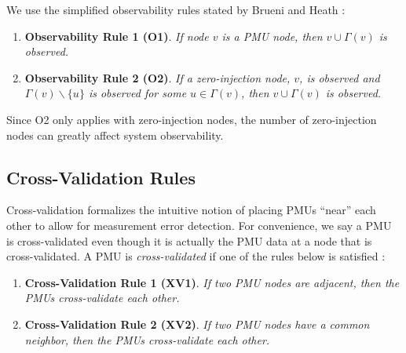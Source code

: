 We use the simplified observability rules stated by Brueni and Heath \cite{Brueni05}:
\begin{enumerate}
	
	\item {\bf Observability Rule 1 (O1)}.  {\it If node $v$ is a PMU node, then $v \cup \Gamma(v)$ is observed. } %

	\item {\bf Observability Rule 2 (O2)}. {\it If a zero-injection node, $v$, is observed and  $\Gamma(v)\backslash\{u\}$ is observed for some $u\in\Gamma(v)$, then $v \cup \Gamma(v)$ is observed.}

\end{enumerate}
Since O2 only applies with zero-injection nodes, the number of zero-injection nodes can greatly affect system observability. 

\subsection{Cross-Validation Rules}
\label{subsec:xval-rules}

Cross-validation formalizes the intuitive notion of placing PMUs ``near'' each other to allow for measurement error detection. 
For convenience, we say a PMU is cross-validated even though it is actually the PMU data at a node that is cross-validated.
A PMU is \emph{cross-validated} if one of the rules below is satisfied \cite{Vanfretti10}: 
\begin{enumerate}
	
	\item {\bf Cross-Validation Rule 1 (XV1)}.  {\it If two PMU nodes are adjacent, then the PMUs cross-validate each other. }

	\item {\bf Cross-Validation Rule 2 (XV2)}. {\it If two PMU nodes have a common neighbor, then the PMUs cross-validate each other.}
\end{enumerate}

